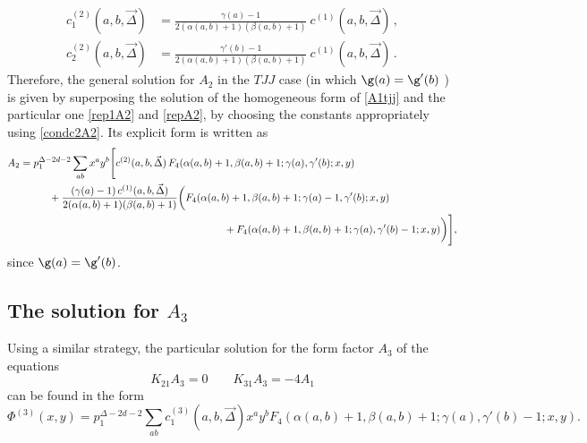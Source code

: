 \documentclass[a4paper,11pt,openright,twoside]{book}
\numberwithin{equation}{section}
\begin{document}
{{{\begin{equation}
	\begin{split}
		c_1^{(2)}(a,b,\vec{\Delta})&=\frac{\gamma(a)-1}{2(\alpha(a,b)+1)(\beta(a,b)+1)}\ c^{(1)}(a,b,\vec \Delta)\,,\\
		c_2^{(2)}(a,b,\vec{\Delta})&=\frac{\gamma'(b)-1}{2(\alpha(a,b)+1)(\beta(a,b)+1)}\ c^{(1)}(a,b,\vec \Delta)\,.
	\end{split}
	\label{condc2A2}
\end{equation}
Therefore, the general solution for $A_2$ in the $TJJ$ case (in which $\g(a)=\g'(b)$ ) is given by superposing the solution of the homogeneous form of \eqref{A1tjj} and the particular one \eqref{rep1A2} and \eqref{repA2}, by choosing the constants appropriately using \eqref{condc2A2}. Its explicit form is written as
\begin{align}
	A_2&= p_1^{\Delta-2 d - 2}\sum_{a b} x^a y^b\Bigg[c^{(2)}(a,b,\vec{\Delta})\,F_4(\alpha(a,b)+1, \beta(a,b)+1; \gamma(a), \gamma'(b); x, y)\notag\\
	&\hspace{1cm}+ \frac{(\gamma(a)-1)\,c^{(1)}(a,b,\vec \Delta)}{2(\alpha(a,b)+1)(\beta(a,b)+1)}\bigg(F_4(\alpha(a,b) +1, \beta(a,b)+1; \gamma(a)-1, \gamma'(b); x, y)\notag\\
	&\hspace{7cm}+ F_4(\alpha(a,b) +1, \beta(a,b)+1; \gamma(a), \gamma'(b)-1; x, y)\bigg)\Bigg],
\end{align}
since $\g(a)=\g'(b)$. 
\subsection{The solution for $A_3$}
Using a similar strategy, the particular solution for the form factor $ A_3$ of the equations 
\begin{equation}
	K_{21} A_3 =0 \qquad K_{3 1} A_3=-4 A_1 \label{A3eq}
\end{equation}
can be found in the form 
\begin{equation}
	\Phi^{(3)}(x,y)= p_1^{\Delta-2 d -2} \sum_{a b} c_1^{(3)}(a,b,\vec\Delta) x^a y^b   F_4(\alpha(a,b)+1,\beta(a,b)+1; \gamma(a),\gamma'(b)-1;x,y). 
\end{equation}

}}}
\end{document}
